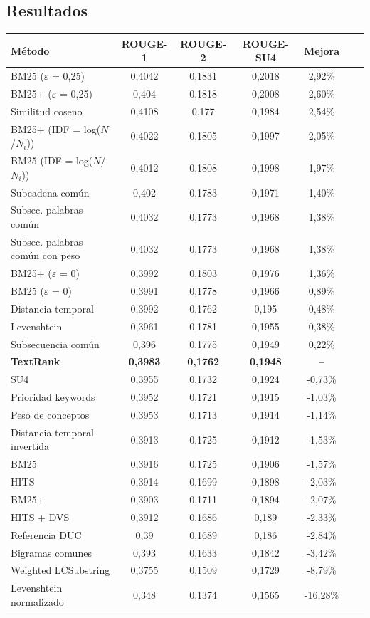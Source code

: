 \documentclass[a4paper]{article}
\begin{document}
\subsection{Resultados}
\begin{tabular}{l*{5}{c}r}
    \hline
    \rule{0pt}{12pt}
	Método & ROUGE-1 & ROUGE-2 & ROUGE-SU4 & Mejora \\[2pt]
    \hline\rule{0pt}{12pt}\mbox{}\par\nobreak
	BM25 ($\varepsilon$ = 0,25) & 0,4042 & 0,1831 & 0,2018 & 2,92\% \\ 
	BM25+ ($\varepsilon$ = 0,25) & 0,404 & 0,1818 & 0,2008 & 2,60\% \\ 
	Similitud coseno & 0,4108 & 0,177 & 0,1984 & 2,54\% \\ 
	BM25+ (IDF = log($N$/$N_i$)) & 0,4022 & 0,1805 & 0,1997 & 2,05\% \\ 
	BM25 (IDF = log($N$/$N_i$)) & 0,4012 & 0,1808 & 0,1998 & 1,97\% \\ 
	Subcadena común & 0,402 & 0,1783 & 0,1971 & 1,40\% \\
	Subsec. palabras común & 0,4032 & 0,1773 & 0,1968 & 1,38\% \\ 
	Subsec. palabras común con peso & 0,4032 & 0,1773 & 0,1968 & 1,38\% \\ 
	BM25+ ($\varepsilon$ = 0) & 0,3992 & 0,1803 & 0,1976 & 1,36\% \\ 
	BM25 ($\varepsilon$ = 0) & 0,3991 & 0,1778 & 0,1966 & 0,89\% \\ 
	Distancia temporal & 0,3992 & 0,1762 & 0,195 & 0,48\% \\ 
	Levenshtein & 0,3961 & 0,1781 & 0,1955 & 0,38\% \\ 
	Subsecuencia común & 0,396 & 0,1775 & 0,1949 & 0,22\% \\ 
    \textbf{TextRank} & \textbf{0,3983} & \textbf{0,1762} & \textbf{0,1948} & \textbf{--} \\
	SU4 & 0,3955 & 0,1732 & 0,1924 & -0,73\% \\ 
	Prioridad keywords & 0,3952 & 0,1721 & 0,1915 & -1,03\% \\
	Peso de conceptos & 0,3953 & 0,1713 & 0,1914 & -1,14\% \\
	Distancia temporal invertida & 0,3913 & 0,1725 & 0,1912 & -1,53\% \\
	BM25 & 0,3916 & 0,1725 & 0,1906 & -1,57\% \\
	HITS & 0,3914 & 0,1699 & 0,1898 & -2,03\% \\
	BM25+ & 0,3903 & 0,1711 & 0,1894 & -2,07\% \\
	HITS + DVS & 0,3912 & 0,1686 & 0,189 & -2,33\% \\
	Referencia DUC & 0,39 & 0,1689 & 0,186 & -2,84\% \\
	Bigramas comunes & 0,393 & 0,1633 & 0,1842 & -3,42\% \\
	Weighted LCSubstring & 0,3755 & 0,1509 & 0,1729 & -8,79\% \\
	Levenshtein normalizado & 0,348 & 0,1374 & 0,1565 & -16,28\% \\
\end{tabular}

\newpage
{}

\end{document}
